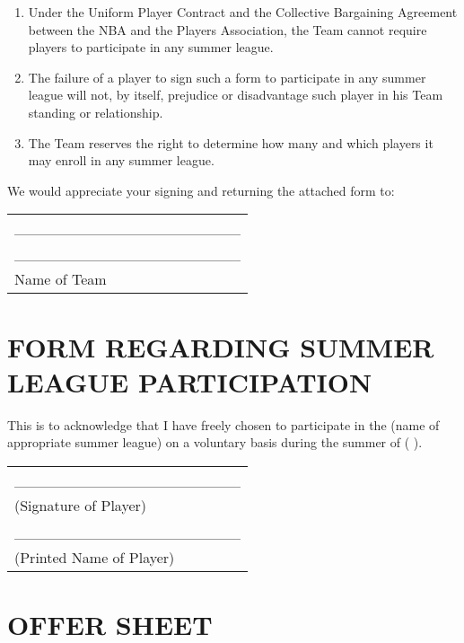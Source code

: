 \documentclass[
]{book}
\providecommand{\tightlist}{%
  \setlength{\itemsep}{0pt}\setlength{\parskip}{0pt}}
\begin{document}
\begin{enumerate}
\def\labelenumi{\arabic{enumi}.}
\tightlist
\item
  Under the Uniform Player Contract and the Collective Bargaining Agreement between the NBA and the Players Association, the Team cannot require players to participate in any summer league.
\item
  The failure of a player to sign such a form to participate in any summer league will not, by itself, prejudice or disadvantage such player in his Team standing or relationship.
\item
  The Team reserves the right to determine how many and which players it may enroll in any summer league.
\end{enumerate}

We would appreciate your signing and returning the attached form to:

\begin{longtable}[]{@{}l@{}}
\toprule()
\endhead
\_\_\_\_\_\_\_\_\_\_\_\_\_\_\_\_\_\_\_\_\_ \\
\_\_\_\_\_\_\_\_\_\_\_\_\_\_\_\_\_\_\_\_\_ \\
Name of Team \\
\bottomrule()
\end{longtable}

\hypertarget{form-regarding-summer-league-participation}{%
\chapter{FORM REGARDING SUMMER LEAGUE PARTICIPATION}\label{form-regarding-summer-league-participation}}

This is to acknowledge that I have freely chosen to participate in the (name of appropriate summer league) on a voluntary basis during the summer of ( ).

\begin{longtable}[]{@{}l@{}}
\toprule()
\endhead
\_\_\_\_\_\_\_\_\_\_\_\_\_\_\_\_\_\_\_\_\_ \\
(Signature of Player) \\
\_\_\_\_\_\_\_\_\_\_\_\_\_\_\_\_\_\_\_\_\_ \\
(Printed Name of Player) \\
\bottomrule()
\end{longtable}

\hypertarget{offer-sheet}{%
\chapter{OFFER SHEET}\label{offer-sheet}}
\end{document}
